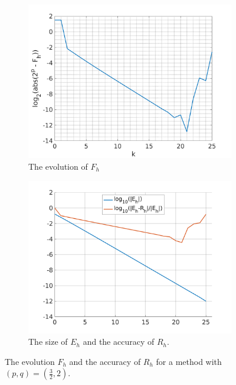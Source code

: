 \documentclass[runningheads]{llncs}
\begin{document}

\begin{figure}
\begin{subfigure}[h]{0.49\linewidth}
\includegraphics[width=\linewidth]{rint_mwe2a.png}
\caption{The evolution of $F_h$} \label{fig:rint_mwe2a}
\end{subfigure}
\hfill
\begin{subfigure}[h]{0.49\linewidth}
\includegraphics[width=\linewidth]{rint_mwe2b.png}
\caption{The size of $E_h$ and the accuracy of $R_h$.} \label{fig:rint_mwe2b}
\end{subfigure}%
\caption{The evolution $F_h$ and the accuracy of $R_h$ for a method with $(p,q) = (\frac{3}{2},2)$.}
\end{figure}
\end{document}
